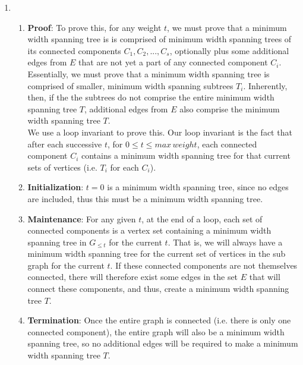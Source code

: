 \documentclass{article}
\begin{document}
\begin{enumerate}
\begin{enumerate}
            \item
                \begin{enumerate}
                    \item \textbf{Proof}: To prove this, for any weight $t$, we must prove that a minimum width spanning
                    tree is is comprised of minimum width spanning trees of its connected components $C_1, C_2, ..., C_s$,
                    optionally plus some additional edges from $E$ that are not yet a part of any connected component
                    $C_i$. Essentially, we must prove that a minimum width spanning tree is comprised of smaller, minimum width
                    spanning subtrees $T_i$. Inherently, then, if the the subtrees do not comprise the entire minimum width
                    spanning tree $T$, additional edges from $E$ also comprise the minimum width spanning tree $T$. \\
                    
                    We use a loop invariant to prove this. Our loop invariant is the fact that after each successive $t$, for $0 \leq t \leq max \hspace{2pt} weight$, each connected component $C_i$ contains a minimum width spanning tree for that current sets of vertices (i.e. $T_i$ for each $C_i$). \\
                    
                    \item \textbf{Initialization}: $t = 0$ is a minimum width spanning tree, since no edges are included,
                    thus this must be a minimum width spanning tree.
                    
                    \item \textbf{Maintenance}: For any given $t$, at the end of a loop, each set of connected components is a vertex set containing a minimum width spanning tree in $G_{\leq t}$ for the current $t$. That is, we will always have a minimum width spanning tree for the current set of vertices in the sub graph for the current $t$. If these connected components are not themselves connected, there will therefore exist some edges in the set $E$ that will connect these components, and thus, create a minimum width spanning tree $T$.
                    
                    \item \textbf{Termination}: Once the entire graph is connected (i.e. there is only one connected
                    component), the entire graph will also be a minimum width spanning tree, so no additional edges will be
                    required to make a minimum width spanning tree $T$.
                    

\end{enumerate}
\end{enumerate}
\end{enumerate}
\end{document}
